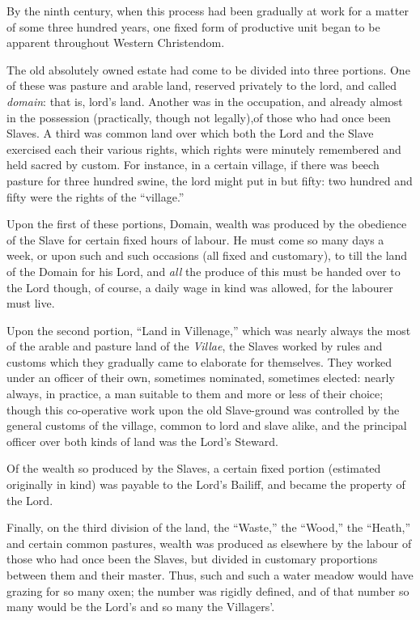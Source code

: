 \documentclass{book}
\begin{document}
By the ninth century, when this process had been gradually at work for a matter of some three hundred years, one fixed form of productive unit began to be apparent throughout Western Christendom.

The old absolutely owned estate had come to be divided into three portions. One of these was pasture and arable land, reserved privately to the lord, and called \emph{domain}: that is, lord’s land. Another was in the occupation, and already almost in the possession (practically, though not legally),of those who had once been Slaves. A third was common land over which both the Lord and the Slave exercised each their various rights, which rights were minutely remembered and held sacred by custom. For instance, in a certain village, if there was beech pasture for three hundred swine, the lord might put in but fifty: two hundred and fifty were the rights of the “village.”

Upon the first of these portions, Domain, wealth was produced by the obedience of the Slave for certain fixed hours of labour. He must come so many days a week, or upon such and such occasions (all fixed and customary), to till the land of the Domain for his Lord, and \emph{all} the produce of this must be handed over to the Lord though, of course, a daily wage in kind was allowed, for the labourer must live.

Upon the second portion, “Land in Villenage,” which was nearly always the most of the arable and pasture land of the \emph{Villae}, the Slaves worked by rules and customs which they gradually came to elaborate for themselves. They worked under an officer of their own, sometimes nominated, sometimes elected: nearly always, in practice, a man suitable to them and more or less of their choice; though this co-operative work upon the old Slave-ground was controlled by the general customs of the village, common to lord and slave alike, and the principal officer over both kinds of land was the Lord’s Steward.

Of the wealth so produced by the Slaves, a certain fixed portion (estimated originally in kind) was payable to the Lord’s Bailiff, and became the property of the Lord.

Finally, on the third division of the land, the “Waste,” the “Wood,” the “Heath,” and certain common pastures, wealth was produced as elsewhere by the labour of those who had once been the Slaves, but divided in customary proportions between them and their master. Thus, such and such a water meadow would have grazing for so many oxen; the number was rigidly defined, and of that number so many would be the Lord’s and so many the Villagers’.
\end{document}
